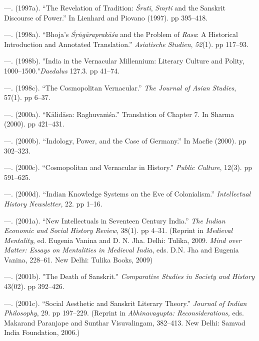 \begin{thebibliography}{99}
 \item —. (1997a). “The Revelation of Tradition: \textit{Śruti}, \textit{Smṛti} and the Sanskrit Discourse of Power.” In Lienhard and Piovano (1997). pp 395–418.

 \item —. (1998a). “Bhoja's \textit{Śṛṅgāraprakāśa} and the Problem of \textit{Rasa}: A Historical Introduction and Annotated Translation.” \textit{Asiatische Studien}, \textit{52}(1). pp 117–93.

 \item —. (1998b). "India in the Vernacular Millennium: Literary Culture and Polity, 1000–1500."\textit{Daedalus} 127.3. pp 41–74.

 \item —. (1998c). “The Cosmopolitan Vernacular.” \textit{The Journal of Asian Studies}, 57(1). pp 6–37.

 \item —. (2000a). “Kālidāsa: Raghuvaṁśa.” Translation of Chapter 7. In Sharma (2000). pp 421–431.

 \item —. (2000b). “Indology, Power, and the Case of Germany.” In Macfie (2000). pp 302–323.

 \item —. (2000c). “Cosmopolitan and Vernacular in History.” \textit{Public Culture}, 12(3). pp 591–625.

 \item —. (2000d). “Indian Knowledge Systems on the Eve of Colonialism.” \textit{Intellectual History Newsletter}, 22. pp 1–16.

 \item —. (2001a). “New Intellectuals in Seventeen Century India.” \textit{The Indian Economic and Social History Review}, 38(1). pp 4–31. (Reprint in \textit{Medieval Mentality}, ed. Eugenia Vanina and D. N. Jha. Delhi: Tulika, 2009. \textit{Mind over Matter: Essays on Mentalities in Medieval India}, eds. D.N. Jha and Eugenia Vanina, 228–61. New Delhi: Tulika Books, 2009)

 \item —. (2001b). "The Death of Sanskrit." \textit{Comparative Studies in Society and History} 43(02). pp 392–426.

 \item —. (2001c). “Social Aesthetic and Sanskrit Literary Theory.” \textit{Journal of Indian Philosophy}, 29. pp 197–229. (Reprint in \textit{Abhinavagupta: Reconsiderations, }eds. Makarand Paranjape and Sunthar Visuvalingam, 382–413. New Delhi: Samvad India Foundation, 2006.)


\end{thebibliography}
